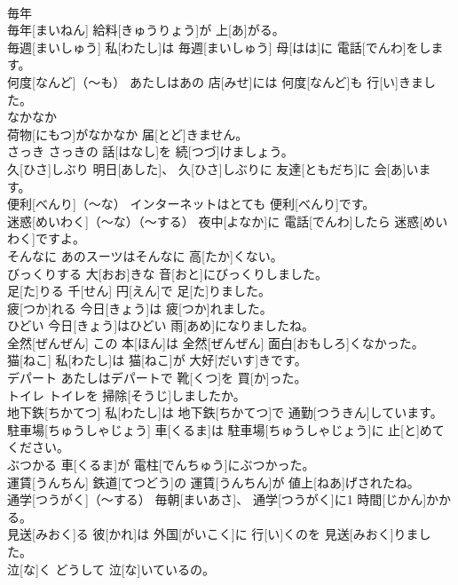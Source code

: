 \documentclass[8pt]{extreport}
\begin{document}
\begin{CJK}{UTF8}{min}
\\	毎年
\\	[まいねん]	毎年[まいねん] 給料[きゅうりょう]が 上[あ]がる。		
\\	毎週[まいしゅう]	私[わたし]は 毎週[まいしゅう] 母[はは]に 電話[でんわ]をします。		
\\	何度[なんど]（～も）	あたしはあの 店[みせ]には 何度[なんど]も 行[い]きました。		
\\	なかなか
\\	荷物[にもつ]がなかなか 届[とど]きません。		
\\	さっき	さっきの 話[はなし]を 続[つづ]けましょう。		
\\	久[ひさ]しぶり	明日[あした]、 久[ひさ]しぶりに 友達[ともだち]に 会[あ]います。		
\\	便利[べんり]（～な）	インターネットはとても 便利[べんり]です。		
\\	迷惑[めいわく]（～な）（～する）	夜中[よなか]に 電話[でんわ]したら 迷惑[めいわく]ですよ。		
\\	そんなに	あのスーツはそんなに 高[たか]くない。		
\\	びっくりする	大[おお]きな 音[おと]にびっくりしました。		
\\	足[た]りる	千[せん] 円[えん]で 足[た]りました。		
\\	疲[つか]れる	今日[きょう]は 疲[つか]れました。		
\\	ひどい	今日[きょう]はひどい 雨[あめ]になりましたね。		
\\	全然[ぜんぜん]	この 本[ほん]は 全然[ぜんぜん] 面白[おもしろ]くなかった。		
\\	猫[ねこ]	私[わたし]は 猫[ねこ]が 大好[だいす]きです。		
\\	デパート	あたしはデパートで 靴[くつ]を 買[か]った。		
\\	トイレ	トイレを 掃除[そうじ]しましたか。		
\\	地下鉄[ちかてつ]	私[わたし]は 地下鉄[ちかてつ]で 通勤[つうきん]しています。		
\\	駐車場[ちゅうしゃじょう]	車[くるま]は 駐車場[ちゅうしゃじょう]に 止[と]めてください。		
\\	ぶつかる	車[くるま]が 電柱[でんちゅう]にぶつかった。		
\\	運賃[うんちん]	鉄道[てつどう]の 運賃[うんちん]が 値上[ねあ]げされたね。		
\\	通学[つうがく]（～する）	毎朝[まいあさ]、 通学[つうがく]に1 時間[じかん]かかる。		
\\	見送[みおく]る	彼[かれ]は 外国[がいこく]に 行[い]くのを 見送[みおく]りました。		
\\	泣[な]く	どうして 泣[な]いているの。		

\end{CJK}
\end{document}
